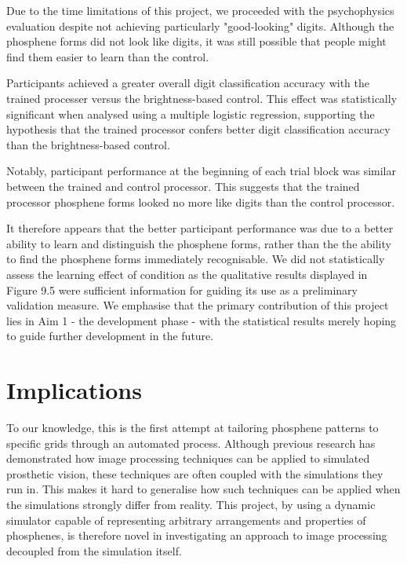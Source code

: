 \documentclass[a4paper,11pt,openany]{book}
\begin{document}
Due to the time limitations of this project, we proceeded with the psychophysics evaluation despite not achieving particularly "good-looking" digits.
Although the phosphene forms did not look like digits, it was still possible that people might find them easier to learn than the control.

Participants achieved a greater overall digit classification accuracy with the trained processer versus the brightness-based control.
This effect was statistically significant when analysed using a multiple logistic regression, supporting the hypothesis that the trained processor confers better digit classification accuracy than the brightness-based control.

Notably, participant performance at the beginning of each trial block was similar between the trained and control processor.
This suggests that the trained processor phosphene forms looked no more like digits than the control processor.

It therefore appears that the better participant performance was due to a better ability to learn and distinguish the phosphene forms, rather than the the ability to find the phosphene forms immediately recognisable.
We did not statistically assess the learning effect of condition as the qualitative results displayed in Figure 9.5 were sufficient information for guiding its use as a preliminary validation measure.
We emphasise that the primary contribution of this project lies in Aim 1 - the development phase - with the statistical results merely hoping to guide further development in the future.


\chapter{Implications}
\label{sec:orgd9da367}

To our knowledge, this is the first attempt at tailoring phosphene patterns to specific grids through an automated process.
Although previous research has demonstrated how image processing techniques can be applied to simulated prosthetic vision, these techniques are often coupled with the simulations they run in.
This makes it hard to generalise how such techniques can be applied when the simulations strongly differ from reality.
This project, by using a dynamic simulator capable of representing arbitrary arrangements and properties of phosphenes, is therefore novel in investigating an approach to image processing decoupled from the simulation itself.
\end{document}
